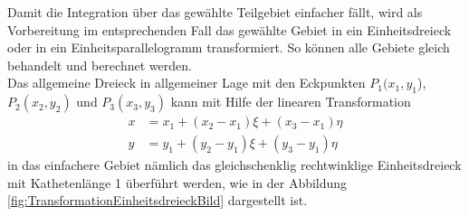 Damit die Integration über das gewählte Teilgebiet einfacher fällt, wird als Vorbereitung im entsprechenden Fall das gewählte Gebiet in ein Einheitsdreieck oder in ein Einheitsparallelogramm transformiert. So können alle Gebiete gleich behandelt und berechnet werden. \\
Das allgemeine Dreieck in allgemeiner Lage mit den Eckpunkten $P_1(x_1, y_1$), $ P_2(x_2, y_2)$ und $P_3(x_3,y_3)$ kann mit Hilfe der linearen Transformation
\begin{equation}
	\begin{split}
		x &= x_1 + (x_2 - x_1)\xi + (x_3 - x_1)\eta \\
		y &= y_1 + (y_2 - y_1)\xi + (y_3 - y_1)\eta
		\label{fem:linTransformation}
	\end{split}
\end{equation}
in das einfachere Gebiet nämlich das gleichschenklig rechtwinklige Einheitsdreieck mit Kathetenlänge 1 überführt werden, wie in der Abbildung \ref{fig:TransformationEinheitsdreieckBild} dargestellt ist.

